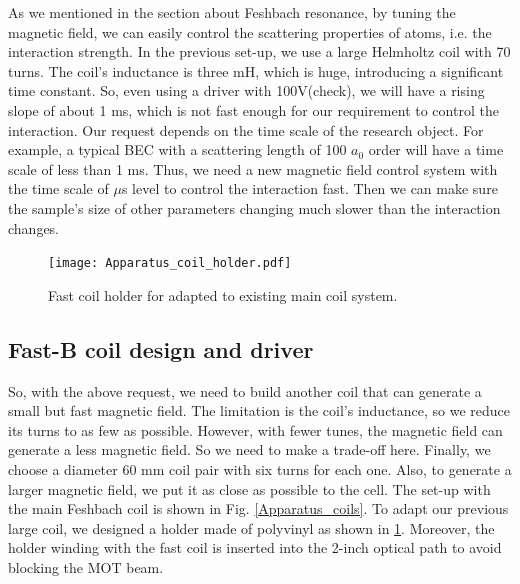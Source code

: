 As we mentioned in the section about Feshbach resonance, by tuning the magnetic field, we can easily control the scattering properties of atoms, i.e. the interaction strength. In the previous set-up, we use a large Helmholtz coil with 70 turns. The coil's inductance is three mH, which is huge, introducing a significant time constant. So, even using a driver with 100V(check), we will have a rising slope of about 1 ms, which is not fast enough for our requirement to control the interaction. Our request depends on the time scale of the research object. For example, a typical BEC with a scattering length of 100 $a_0$ order will have a time scale of less than 1 ms. Thus, we need a new magnetic field control system with the time scale of $\mu$s level to control the interaction fast. Then we can make sure the sample's size of other parameters changing much slower than the interaction changes.

\begin{figure}[htb]
\begin{center}
\texttt{[image: Apparatus\_coil\_holder.pdf]}
\end{center}
\caption[Fast coil holder]{Fast coil holder for adapted to existing main coil system.}
\label{Apparatus_coil_holder}
\end{figure}

\subsection{Fast-B coil design and driver}

So, with the above request, we need to build another coil that can generate a small but fast magnetic field. The limitation is the coil's inductance, so we reduce its turns to as few as possible. However, with fewer tunes, the magnetic field can generate a less magnetic field. So we need to make a trade-off here. Finally, we choose a diameter 60 mm coil pair with six turns for each one. Also, to generate a larger magnetic field, we put it as close as possible to the cell. The set-up with the main Feshbach coil is shown in Fig. \ref{Apparatus_coils}. To adapt our previous large coil, we designed a holder made of polyvinyl as shown in \ref{Apparatus_coil_holder}. Moreover, the holder winding with the fast coil is inserted into the 2-inch optical path to avoid blocking the MOT beam.

